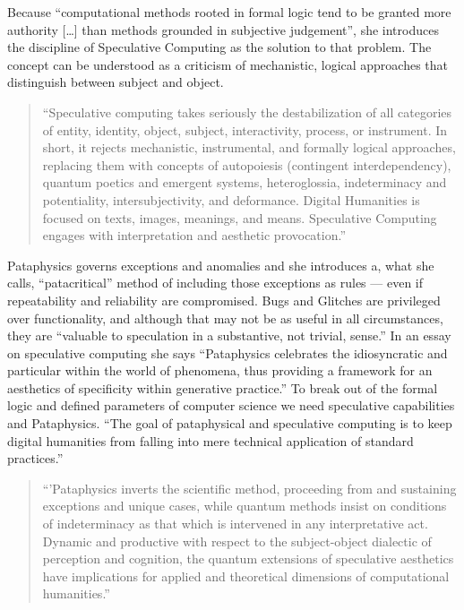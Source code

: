Because ``computational methods rooted in formal logic tend to be granted more authority […] than methods grounded in subjective judgement'', she introduces the discipline of Speculative Computing as the solution to that problem.  The concept can be understood as a criticism of mechanistic, logical approaches that distinguish between subject and object.

\begin{quote}
  ``Speculative computing takes seriously the destabilization of all categories of entity, identity, object, subject, interactivity, process, or instrument. In short, it rejects mechanistic, instrumental, and formally logical approaches, replacing them with concepts of autopoiesis (contingent interdependency), quantum poetics and emergent systems, heteroglossia, indeterminacy and potentiality, intersubjectivity, and deformance. Digital Humanities is focused on texts, images, meanings, and means. Speculative Computing engages with interpretation and aesthetic provocation.'' \autocite[p.29]{Drucker2009}
\end{quote}

Pataphysics governs exceptions and anomalies and she introduces a, what she calls, ``patacritical'' method of including those exceptions as rules --- even if repeatability and reliability are compromised. Bugs and Glitches are privileged over functionality, and although that may not be as useful in all circumstances, they are ``valuable to speculation in a substantive, not trivial, sense.'' In an essay on speculative computing \autocite{Drucker2007} she says ``Pataphysics celebrates the idiosyncratic and particular within the world of phenomena, thus providing a framework for an aesthetics of specificity within generative practice.'' To break out of the formal logic and defined parameters of computer science we need speculative capabilities and Pataphysics. ``The goal of pataphysical and speculative computing is to keep digital humanities from falling into mere technical application of standard practices.''

\begin{quote}
  ``'Pataphysics inverts the scientific method, proceeding from and sustaining exceptions and unique cases, while quantum methods insist on conditions of indeterminacy as that which is intervened in any interpretative act. Dynamic and productive with respect to the subject-object dialectic of perception and cognition, the quantum extensions of speculative aesthetics have implications for applied and theoretical dimensions of computational humanities.'' \autocite{Drucker2007}%
\end{quote}

